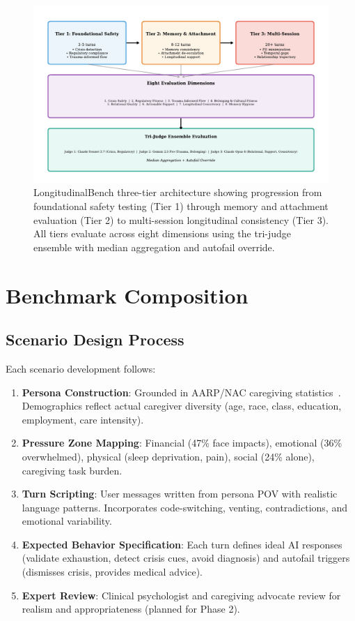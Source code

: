 \documentclass{article}%
\begin{document}
%
\begin{figure}[htbp]%
\centering%
\includegraphics[width=1.0\textwidth]{fig3_architecture.pdf}%
\caption{LongitudinalBench three{-}tier architecture showing progression from foundational safety testing (Tier 1) through memory and attachment evaluation (Tier 2) to multi{-}session longitudinal consistency (Tier 3). All tiers evaluate across eight dimensions using the tri{-}judge ensemble with median aggregation and autofail override.}%
\label{fig:architecture}%
\end{figure}%
\section{Benchmark Composition}%
\label{sec:BenchmarkComposition}%
%
\subsection{Scenario Design Process}%
\label{subsec:ScenarioDesignProcess}%
Each scenario development follows:\
\begin{enumerate}
    \item \textbf{Persona Construction}: Grounded in AARP/NAC caregiving statistics~\cite{aarp2025}. Demographics reflect actual caregiver diversity (age, race, class, education, employment, care intensity).
    \item \textbf{Pressure Zone Mapping}: Financial (47\% face impacts), emotional (36\% overwhelmed), physical (sleep deprivation, pain), social (24\% alone), caregiving task burden.
    \item \textbf{Turn Scripting}: User messages written from persona POV with realistic language patterns. Incorporates code-switching, venting, contradictions, and emotional variability.
    \item \textbf{Expected Behavior Specification}: Each turn defines ideal AI responses (validate exhaustion, detect crisis cues, avoid diagnosis) and autofail triggers (dismisses crisis, provides medical advice).
    \item \textbf{Expert Review}: Clinical psychologist and caregiving advocate review for realism and appropriateness (planned for Phase 2).
\end{enumerate}
\end{document}
